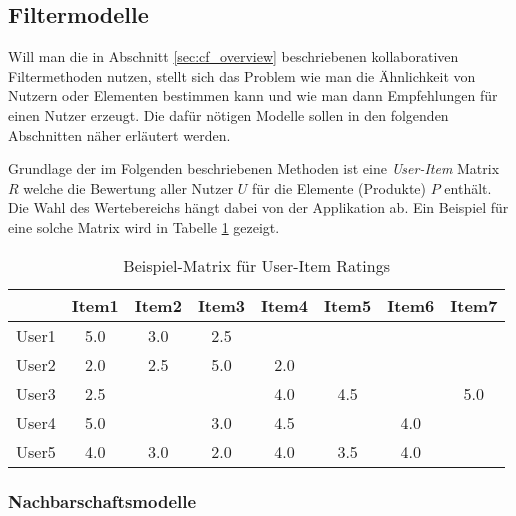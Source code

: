 \subsection{Filtermodelle}
\label{sec:filtermethods}

Will man die in Abschnitt \ref{sec:cf_overview} beschriebenen kollaborativen Filtermethoden nutzen, stellt sich das Problem wie man die Ähnlichkeit von Nutzern oder Elementen bestimmen kann und wie man dann Empfehlungen für einen Nutzer erzeugt. Die dafür nötigen Modelle sollen in den folgenden Abschnitten näher erläutert werden.

Grundlage der im Folgenden beschriebenen Methoden ist eine \textit{User-Item} Matrix $R$ welche die Bewertung aller Nutzer $U$ für die Elemente (Produkte) $P$ enthält. Die Wahl des Wertebereichs hängt dabei von der Applikation ab. Ein Beispiel für eine solche Matrix wird in Tabelle \ref{tab:user-item-ratings} gezeigt.


\begin{table}
  \centering
  \begin{tabular}{ | l || c | c | c | c | c | c | c | }
    \hline
           & Item1 & Item2 & Item3 & Item4 & Item5 & Item6 & Item7 \\ \hline
User1 &    5.0 & 3.0      & 2.5     &            & & & \\				
User2 &    2.0 & 2.5      & 5.0     &  2.0    & & & \\
User3 & 2.5	& & &	4.0 &	 4.5	& &	5.0 \\
User4 & 5.0	& &	3.0	& 4.5 & &	4.0 &	 \\
User5 & 4.0	&3.0 &	2.0 &	4.0 &  3.5 & 4.0	& \\
    \hline
  \end{tabular}
  \caption{Beispiel-Matrix für User-Item Ratings}
  \label{tab:user-item-ratings}
\end{table}



\subsubsection{Nachbarschaftsmodelle}\newpage

